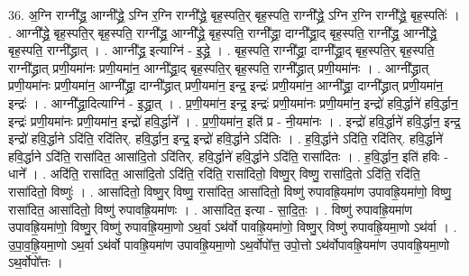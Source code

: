 \documentclass[17pt]{extarticle}
\begin{document}
36. अ॒ग्नि राग्नी᳚द्ध्र॒ आग्नी᳚द्ध्रे॒ ऽग्नि र॒ग्नि राग्नी᳚द्ध्रे॒ बृह॒स्पति॒र् बृह॒स्पति॒ राग्नी᳚द्ध्रे॒ ऽग्नि र॒ग्नि राग्नी᳚द्ध्रे॒ बृह॒स्पतिः॑ । . आग्नी᳚द्ध्रे॒ बृह॒स्पति॒र् बृह॒स्पति॒ राग्नी᳚द्ध्र॒ आग्नी᳚द्ध्रे॒ बृह॒स्पति॒ राग्नी᳚द्ध्रा॒ दाग्नी᳚द्ध्रा॒द् बृह॒स्पति॒ राग्नी᳚द्ध्र॒ आग्नी᳚द्ध्रे॒ बृह॒स्पति॒ राग्नी᳚द्ध्रात् । . आग्नी᳚द्ध्र॒ इत्याग्नि॑ - इ॒द्ध्रे॒ । . बृह॒स्पति॒ राग्नी᳚द्ध्रा॒ दाग्नी᳚द्ध्रा॒द् बृह॒स्पति॒र् बृह॒स्पति॒ राग्नी᳚द्ध्रात् प्रणी॒यमा॑नः प्रणी॒यमा॑न॒ आग्नी᳚द्ध्रा॒द् बृह॒स्पति॒र् बृह॒स्पति॒ राग्नी᳚द्ध्रात् प्रणी॒यमा॑नः । . आग्नी᳚द्ध्रात् प्रणी॒यमा॑नः प्रणी॒यमा॑न॒ आग्नी᳚द्ध्रा॒ दाग्नी᳚द्ध्रात् प्रणी॒यमा॑न॒ इन्द्र॒ इन्द्रः॑ प्रणी॒यमा॑न॒ आग्नी᳚द्ध्रा॒ दाग्नी᳚द्ध्रात् प्रणी॒यमा॑न॒ इन्द्रः॑ । . आग्नी᳚द्ध्रा॒दित्याग्नि॑ - इ॒द्ध्रा॒त् । . प्र॒णी॒यमा॑न॒ इन्द्र॒ इन्द्रः॑ प्रणी॒यमा॑नः प्रणी॒यमा॑न॒ इन्द्रो॑ हवि॒र्द्धाने॑ हवि॒र्द्धान॒ इन्द्रः॑ प्रणी॒यमा॑नः प्रणी॒यमा॑न॒ इन्द्रो॑ हवि॒र्द्धाने᳚ । . प्र॒णी॒यमा॑न॒ इति॑ प्र - नी॒यमा॑नः । . इन्द्रो॑ हवि॒र्द्धाने॑ हवि॒र्द्धान॒ इन्द्र॒ इन्द्रो॑ हवि॒र्द्धाने ऽदि॑ति॒ रदि॑तिर्. हवि॒र्द्धान॒ इन्द्र॒ इन्द्रो॑ हवि॒र्द्धाने ऽदि॑तिः । . ह॒वि॒र्द्धाने ऽदि॑ति॒ रदि॑तिर्. हवि॒र्द्धाने॑ हवि॒र्द्धाने ऽदि॑ति॒ रासा॑दित॒ आसा॑दि॒तो ऽदि॑तिर्. हवि॒र्द्धाने॑ हवि॒र्द्धाने ऽदि॑ति॒ रासा॑दितः । . ह॒वि॒र्द्धान॒ इति॑ हविः - धाने᳚ । . अदि॑ति॒ रासा॑दित॒ आसा॑दि॒तो ऽदि॑ति॒ रदि॑ति॒ रासा॑दितो॒ विष्णु॒र् विष्णु॒ रासा॑दि॒तो ऽदि॑ति॒ रदि॑ति॒ रासा॑दितो॒ विष्णुः॑ । . आसा॑दितो॒ विष्णु॒र् विष्णु॒ रासा॑दित॒ आसा॑दितो॒ विष्णु॑ रुपावह्रि॒यमा॑ण उपावह्रि॒यमा॑णो॒ विष्णु॒ रासा॑दित॒ आसा॑दितो॒ विष्णु॑ रुपावह्रि॒यमा॑णः । . आसा॑दित॒ इत्या - सा॒दि॒तः॒ । . विष्णु॑ रुपावह्रि॒यमा॑ण उपावह्रि॒यमा॑णो॒ विष्णु॒र् विष्णु॑ रुपावह्रि॒यमा॒णो ऽथ॒र्वा ऽथ॑र्वो पावह्रि॒यमा॑णो॒ विष्णु॒र् विष्णु॑ रुपावह्रि॒यमा॒णो ऽथ॑र्वा । . उ॒पा॒व॒ह्रि॒यमा॒णो ऽथ॒र्वा ऽथ॑र्वो पावह्रि॒यमा॑ण उपावह्रि॒यमा॒णो ऽथ॒र्वोपो᳚त्त॒ उपो॒त्तो ऽथ॑र्वोपावह्रि॒यमा॑ण उपावह्रि॒यमा॒णो ऽथ॒र्वोपो᳚त्तः । \newline
\end{document}
